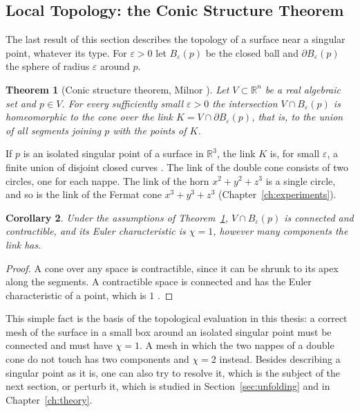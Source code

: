 \documentclass[12pt, a4paper, oneside]{book}
\theoremstyle{plain}
\newtheorem{theorem}{Theorem}[chapter]
\newtheorem{corollary}[theorem]{Corollary}
\theoremstyle{definition}
\theoremstyle{remark}
\theoremstyle{definition}
\begin{document}
\subsection{Local Topology: the Conic Structure Theorem}
\label{sec:conic}

The last result of this section describes the topology of a surface near a singular point, whatever its type. For $\varepsilon>0$ let $B_\varepsilon(p)$ be the closed ball and $\partial B_\varepsilon(p)$ the sphere of radius $\varepsilon$ around $p$.

\begin{theorem}[Conic structure theorem, Milnor \cite{milnor1968singular}]
\label{thm:conic}
Let $V\subset\mathbb{R}^n$ be a real algebraic set and $p\in V$. For every sufficiently small $\varepsilon>0$ the intersection $V\cap B_\varepsilon(p)$ is homeomorphic to the cone over the \emph{link} $K=V\cap\partial B_\varepsilon(p)$, that is, to the union of all segments joining $p$ with the points of $K$.
\end{theorem}

If $p$ is an isolated singular point of a surface in $\mathbb{R}^3$, the link $K$ is, for small $\varepsilon$, a finite union of disjoint closed curves \cite{milnor1968singular}. The link of the double cone consists of two circles, one for each nappe. The link of the horn $x^2+y^2+z^3$ is a single circle, and so is the link of the Fermat cone $x^3+y^3+z^3$ (Chapter~\ref{ch:experiments}).

\begin{corollary}
\label{cor:cone-topology}
Under the assumptions of Theorem~\ref{thm:conic}, $V\cap B_\varepsilon(p)$ is connected and contractible, and its Euler characteristic is $\chi=1$, however many components the link has.
\end{corollary}

\begin{proof}
A cone over any space is contractible, since it can be shrunk to its apex along the segments. A contractible space is connected and has the Euler characteristic of a point, which is $1$ \cite{hatcher2002algebraic}.
\end{proof}

This simple fact is the basis of the topological evaluation in this thesis: a correct mesh of the surface in a small box around an isolated singular point must be connected and must have $\chi=1$. A mesh in which the two nappes of a double cone do not touch has two components and $\chi=2$ instead. Besides describing a singular point as it is, one can also try to resolve it, which is the subject of the next section, or perturb it, which is studied in Section~\ref{sec:unfolding} and in Chapter~\ref{ch:theory}.
\end{document}
